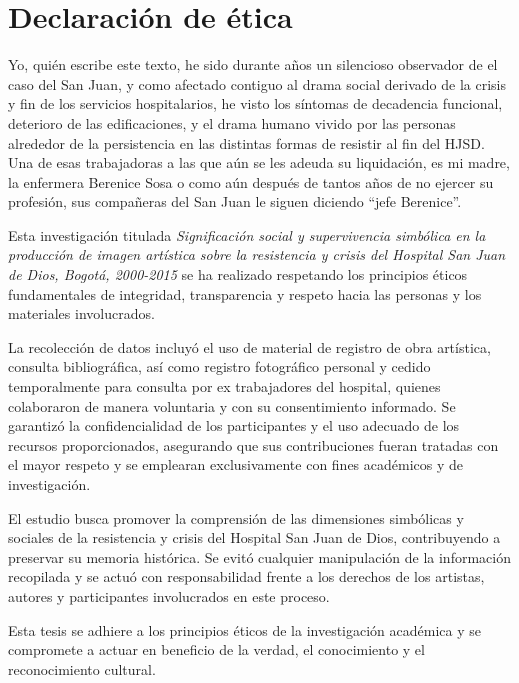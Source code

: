 \section*{Declaración de ética}
\setlength{\parskip}{1em}

Yo, quién escribe este texto, he sido durante años un silencioso observador de el caso del San Juan, y como afectado contiguo al drama social derivado de la crisis y fin de los servicios hospitalarios, he visto los síntomas de decadencia funcional, deterioro de las edificaciones, y el drama humano vivido por las personas alrededor de la persistencia en las distintas formas de resistir al fin del HJSD. Una de esas trabajadoras a las que aún se les adeuda su liquidación, es mi madre, la enfermera Berenice Sosa o como aún después de tantos años de no ejercer su profesión, sus compañeras del San Juan le siguen diciendo “jefe Berenice”.

Esta investigación titulada \textit{Significación social y supervivencia simbólica en la producción de imagen artística sobre la resistencia y crisis del Hospital San Juan de Dios, Bogotá, 2000-2015} se ha realizado respetando los principios éticos fundamentales de integridad, transparencia y respeto hacia las personas y los materiales involucrados.  

La recolección de datos incluyó el uso de material de registro de obra artística, consulta bibliográfica, así como registro fotográfico personal y cedido temporalmente para consulta por ex trabajadores del hospital, quienes colaboraron de manera voluntaria y con su consentimiento informado. Se garantizó la confidencialidad de los participantes y el uso adecuado de los recursos proporcionados, asegurando que sus contribuciones fueran tratadas con el mayor respeto y se emplearan exclusivamente con fines académicos y de investigación.  

El estudio busca promover la comprensión de las dimensiones simbólicas y sociales de la resistencia y crisis del Hospital San Juan de Dios, contribuyendo a preservar su memoria histórica. Se evitó cualquier manipulación de la información recopilada y se actuó con responsabilidad frente a los derechos de los artistas, autores y participantes involucrados en este proceso.  

Esta tesis se adhiere a los principios éticos de la investigación académica y se compromete a actuar en beneficio de la verdad, el conocimiento y el reconocimiento cultural. 
\pagebreak